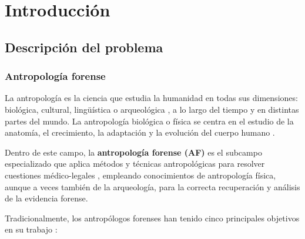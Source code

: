 
\chapter{Introducción}


\section{Descripción del problema}

\subsection{Antropología forense}

La antropología es la ciencia que estudia la humanidad en todas sus dimensiones: biológica, cultural, lingüística o
arqueológica \cite{AAA2022AnthropologyDefinition}, a lo largo del tiempo y en distintas partes del mundo. La antropología 
biológica o física se centra en el estudio de la anatomía, el crecimiento, la adaptación y la evolución del cuerpo humano 
\cite{nawrocki2006}. 

Dentro de este campo, la \textbf{antropología forense (AF)} es el subcampo especializado que aplica métodos y técnicas 
antropológicas para resolver cuestiones médico-legales \cite{nawrocki2006}, empleando conocimientos de 
antropología física, aunque a veces también de la arqueología, para la correcta recuperación y análisis de la evidencia 
forense.

Tradicionalmente, los antropólogos forenses han tenido cinco principales objetivos en su trabajo \cite{byers2023}:

